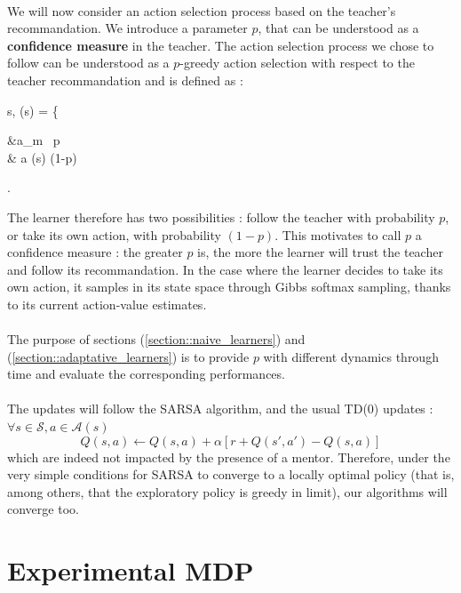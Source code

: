 \documentclass[a4paper]{report}
\begin{document}
{{			\paragraph{} We will now consider an action selection process based on the teacher's recommandation. We introduce a parameter $p$, that can be understood as a \textbf{confidence measure} in the teacher. The action selection process we chose to follow can be understood as a $p$-greedy action selection with respect to the teacher recommandation and is defined as : 
			{
				\forall s\in{}, \quad \pi(s) = \left\{
				\begin{aligned}
					&a_m \, p \\
					& a \in {}(s)  (1-p)
				\end{aligned}\right.
				\label{eq::compliant_exploration}
			}
			The learner therefore has two possibilities : follow the teacher with probability $p$, or take its own action, with probability $(1-p)$. This motivates to call $p$ a confidence measure : the greater $p$ is, the more the learner will trust the teacher and follow its recommandation. In the case where the learner decides to take its own action, it samples in its state space through Gibbs softmax sampling, thanks to its current action-value estimates. 
			
			\paragraph{} The purpose of sections (\ref{section::naive_learners}) and (\ref{section::adaptative_learners}) is to provide $p$ with different dynamics through time and evaluate the corresponding performances. 
			
						
			\paragraph{} The updates will follow the SARSA algorithm, and the usual TD(0) updates : $\forall s\in\mathcal{S}, a\in\mathcal{A}(s)$
			\begin{equation}
				Q(s,a) \leftarrow Q(s,a) + \alpha \left[ r + Q(s',a') - Q(s,a) \right]
			\end{equation}
			which are indeed not impacted by the presence of a mentor. Therefore, under the very simple conditions for SARSA to converge to a locally optimal policy (that is, among others, that the exploratory policy is greedy in limit), our algorithms will converge too. 
		}
		\section{Experimental MDP}
		{
}}
\end{document}
